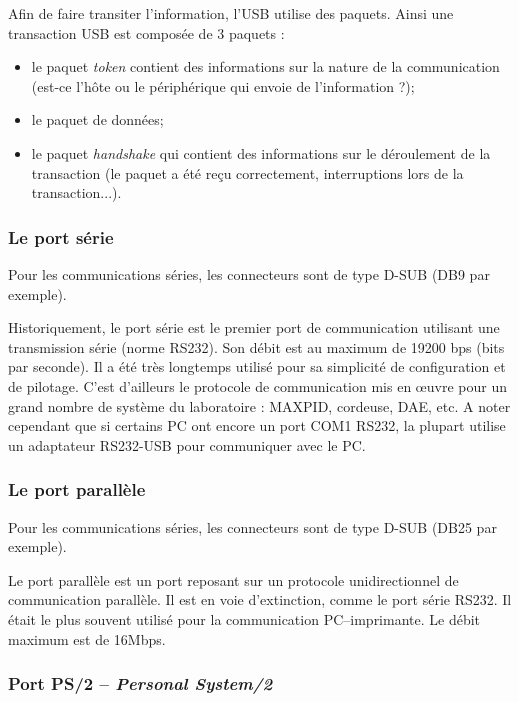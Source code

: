 Afin de faire transiter l'information, l'USB utilise des paquets. Ainsi une transaction USB est composée de 3 paquets :
\begin{itemize}
\item le paquet \textit{token} contient des informations sur la nature de la communication (est-ce l'hôte ou le périphérique qui envoie de l'information ?);
\item le paquet de données;
\item le paquet \textit{handshake} qui contient des informations sur le déroulement de la transaction (le paquet a été reçu correctement, interruptions lors de la transaction...).
\end{itemize}


\subsubsection{Le port série}

Pour les communications séries, les connecteurs sont de type D-SUB (DB9 par exemple).

Historiquement, le port série est le premier port de communication utilisant une transmission série (norme RS232). Son débit est au maximum de 19200 bps (bits par seconde). Il a été très longtemps utilisé pour sa simplicité de configuration et de pilotage. C'est d'ailleurs le protocole de communication mis en œuvre pour un grand nombre de système du laboratoire : MAXPID, cordeuse, DAE, etc. A noter cependant que si certains PC ont encore un port COM1 RS232, la plupart utilise un adaptateur RS232-USB pour communiquer avec le PC.

\subsubsection{Le port parallèle}
Pour les communications séries, les connecteurs sont de type D-SUB (DB25 par exemple).

Le port parallèle est un port reposant sur un protocole unidirectionnel de communication parallèle. Il est en voie d'extinction, comme le port série RS232. Il était le plus souvent utilisé pour la communication PC--imprimante. Le débit maximum  est de 16Mbps.


\subsubsection{Port PS/2 -- \textit{Personal System/2}}

